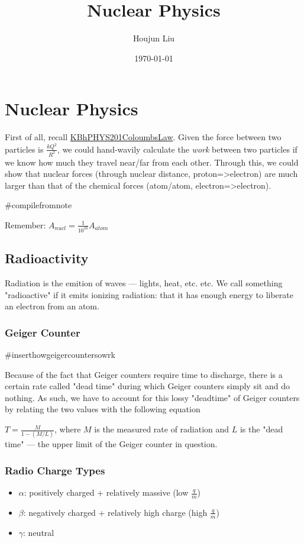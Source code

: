 \documentclass[letterpaper]{article}
\author{Houjun Liu}
\date{\today}
\title{Nuclear Physics}
\renewcommand\maketitle{}
\begin{document}
\maketitle


\section{Nuclear Physics}
\label{sec:orgadb6c61}
First of all, recall
\href{KBhPHYS201ColoumbsLaw.org}{KBhPHYS201ColoumbsLaw}. Given the
force between two particles is \(\frac{kQ^2}{R^2}\), we could
hand-wavily calculate the \emph{work} between two particles if we know how
much they travel near/far from each other. Through this, we could show
that nuclear forces (through nuclear distance, proton=>electron) are
much larger than that of the chemical forces (atom/atom,
electron=>electron).

\#compilefromnote

Remember: \(A_{nucl} = \frac{1}{10^{10}} A_{atom}\)

\subsection{Radioactivity}
\label{sec:org96332fb}
Radiation is the emition of waves --- lights, heat, etc. etc. We call
something "radioactive" if it emits ionizing radiation: that it has
enough energy to liberate an electron from an atom.

\subsubsection{Geiger Counter}
\label{sec:orga954312}
\#inserthowgeigercountersowrk

Because of the fact that Geiger counters require time to discharge,
there is a certain rate called "dead time" during which Geiger counters
simply sit and do nothing. As such, we have to account for this lossy
"deadtime" of Geiger counters by relating the two values with the
following equation

\(T = \frac{M}{1-(M/L)}\), where \(M\) is the measured rate of radiation
and \(L\) is the "dead time" --- the upper limit of the Geiger counter
in question.

\subsubsection{Radio Charge Types}
\label{sec:org0c35c2c}
\begin{itemize}
\item \(\alpha\): positively charged + relatively massive (low
\(\frac{q}{m}\))
\item \(\beta\): negatively charged + relatively high charge (high
\(\frac{q}{m}\))
\item \(\gamma\): neutral
\end{itemize}
\end{document}

